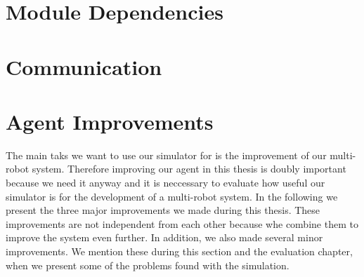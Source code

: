 \section{Module Dependencies}
\label{sec:module_dependencies}


\section{Communication}
\label{sec:imp_communication}


\section{Agent Improvements}
\label{sec:agent_improvements}
The main taks we want to use our simulator for is the improvement of our multi-robot system. Therefore improving our agent in this thesis is doubly important because we need it anyway and it is neccessary to evaluate how useful our simulator is for the development of a multi-robot system. In the following we present the three major improvements we made during this thesis. These improvements are not independent from each other because whe combine them to improve the system even further. In addition, we also made several minor improvements. We mention these during this section and the evaluation chapter, when we present some of the problems found with the simulation.


